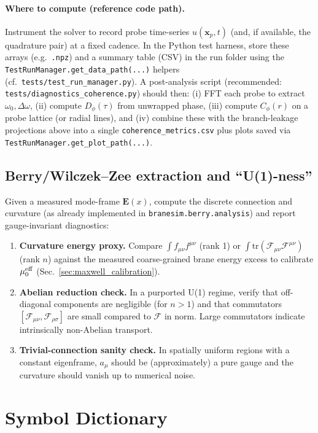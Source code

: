 \documentclass[11pt,a4paper]{article}
\newcommand{\x}{\mathbf{x}}                 %
\newcommand{\bbF}{\mathcal{F}}              %
\begin{document}
\paragraph{Where to compute (reference code path).}
Instrument the solver to record probe time-series \(u(\x_p,t)\) (and, if available, the quadrature pair) at a fixed cadence.
In the Python test harness, store these arrays (e.g.\ \texttt{.npz}) and a summary table (CSV) in the run folder using the
\texttt{TestRunManager.get\_data\_path(...)} helpers (cf.\ \texttt{tests/test\_run\_manager.py}).
A post-analysis script (recommended: \texttt{tests/diagnostics\_coherence.py}) should then:
(i) FFT each probe to extract \(\omega_0,\Delta\omega\),
(ii) compute \(D_\phi(\tau)\) from unwrapped phase,
(iii) compute \(C_\phi(r)\) on a probe lattice (or radial lines),
and (iv) combine these with the branch-leakage projections above into a single
\texttt{coherence\_metrics.csv} plus plots saved via \texttt{TestRunManager.get\_plot\_path(...)}.

\subsection{Berry/Wilczek--Zee extraction and ``U(1)-ness''}
Given a measured mode-frame \(\mathbf{E}(x)\), compute the discrete connection and curvature (as already implemented in
\texttt{branesim.berry.analysis}) and report gauge-invariant diagnostics:
\begin{enumerate}
  \item \textbf{Curvature energy proxy.} Compare \(\int f_{\mu\nu}f^{\mu\nu}\) (rank 1) or \(\int \mathrm{tr}(\bbF_{\mu\nu}\bbF^{\mu\nu})\)
        (rank \(n\)) against the measured coarse-grained brane energy excess to calibrate \(\mu_0^{\rm eff}\)
        (Sec.~\ref{sec:maxwell_calibration}).
  \item \textbf{Abelian reduction check.} In a purported U(1) regime, verify that off-diagonal components are negligible
        (for \(n>1\)) and that commutators \([\bbF_{\mu\nu},\bbF_{\rho\sigma}]\) are small compared to \(\bbF\) in norm.
        Large commutators indicate intrinsically non-Abelian transport.
  \item \textbf{Trivial-connection sanity check.} In spatially uniform regions with a constant eigenframe,
        \(a_\mu\) should be (approximately) a pure gauge and the curvature should vanish up to numerical noise.
\end{enumerate}


\section{Symbol Dictionary}
\label{app:dictionary}
\end{document}
